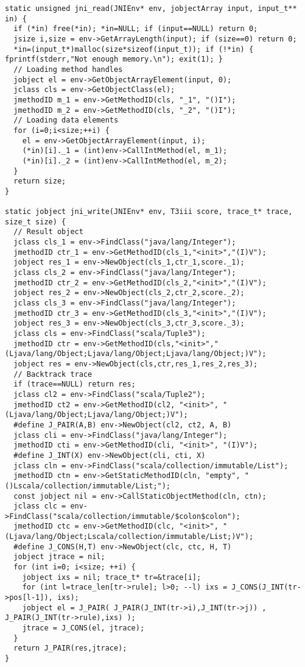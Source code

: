 \begin{verbatim}
static unsigned jni_read(JNIEnv* env, jobjectArray input, input_t** in) {
  if (*in) free(*in); *in=NULL; if (input==NULL) return 0;
  jsize i,size = env->GetArrayLength(input); if (size==0) return 0;
  *in=(input_t*)malloc(size*sizeof(input_t)); if (!*in) { fprintf(stderr,"Not enough memory.\n"); exit(1); }
  // Loading method handles
  jobject el = env->GetObjectArrayElement(input, 0);
  jclass cls = env->GetObjectClass(el);
  jmethodID m_1 = env->GetMethodID(cls, "_1", "()I");
  jmethodID m_2 = env->GetMethodID(cls, "_2", "()I");
  // Loading data elements
  for (i=0;i<size;++i) {
    el = env->GetObjectArrayElement(input, i);
    (*in)[i]._1 = (int)env->CallIntMethod(el, m_1);
    (*in)[i]._2 = (int)env->CallIntMethod(el, m_2);
  }
  return size;
}

static jobject jni_write(JNIEnv* env, T3iii score, trace_t* trace, size_t size) {
  // Result object
  jclass cls_1 = env->FindClass("java/lang/Integer");
  jmethodID ctr_1 = env->GetMethodID(cls_1,"<init>","(I)V");
  jobject res_1 = env->NewObject(cls_1,ctr_1,score._1);
  jclass cls_2 = env->FindClass("java/lang/Integer");
  jmethodID ctr_2 = env->GetMethodID(cls_2,"<init>","(I)V");
  jobject res_2 = env->NewObject(cls_2,ctr_2,score._2);
  jclass cls_3 = env->FindClass("java/lang/Integer");
  jmethodID ctr_3 = env->GetMethodID(cls_3,"<init>","(I)V");
  jobject res_3 = env->NewObject(cls_3,ctr_3,score._3);
  jclass cls = env->FindClass("scala/Tuple3");
  jmethodID ctr = env->GetMethodID(cls,"<init>","(Ljava/lang/Object;Ljava/lang/Object;Ljava/lang/Object;)V");
  jobject res = env->NewObject(cls,ctr,res_1,res_2,res_3);
  // Backtrack trace
  if (trace==NULL) return res;
  jclass cl2 = env->FindClass("scala/Tuple2");
  jmethodID ct2 = env->GetMethodID(cl2, "<init>", "(Ljava/lang/Object;Ljava/lang/Object;)V");
  #define J_PAIR(A,B) env->NewObject(cl2, ct2, A, B)
  jclass cli = env->FindClass("java/lang/Integer");
  jmethodID cti = env->GetMethodID(cli, "<init>", "(I)V");
  #define J_INT(X) env->NewObject(cli, cti, X)
  jclass cln = env->FindClass("scala/collection/immutable/List");
  jmethodID ctn = env->GetStaticMethodID(cln, "empty", "()Lscala/collection/immutable/List;");
  const jobject nil = env->CallStaticObjectMethod(cln, ctn);
  jclass clc = env->FindClass("scala/collection/immutable/$colon$colon");
  jmethodID ctc = env->GetMethodID(clc, "<init>", "(Ljava/lang/Object;Lscala/collection/immutable/List;)V");
  #define J_CONS(H,T) env->NewObject(clc, ctc, H, T)
  jobject jtrace = nil;
  for (int i=0; i<size; ++i) {
    jobject ixs = nil; trace_t* tr=&trace[i];
    for (int l=trace_len[tr->rule]; l>0; --l) ixs = J_CONS(J_INT(tr->pos[l-1]), ixs);
    jobject el = J_PAIR( J_PAIR(J_INT(tr->i),J_INT(tr->j)) , J_PAIR(J_INT(tr->rule),ixs) );
    jtrace = J_CONS(el, jtrace);
  }
  return J_PAIR(res,jtrace);
}


\end{verbatim}
